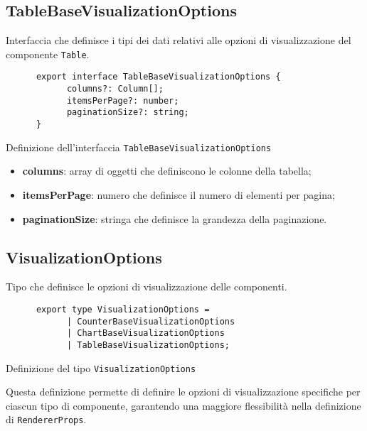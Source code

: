 \subsection{TableBaseVisualizationOptions}
Interfaccia che definisce i tipi dei dati relativi alle opzioni di visualizzazione del componente \texttt{Table}.
\begin{listing}[H]
      \begin{verbatim}
      export interface TableBaseVisualizationOptions {
            columns?: Column[];
            itemsPerPage?: number;
            paginationSize?: string;
      }
      \end{verbatim}
      \caption{Definizione dell'interfaccia \texttt{TableBaseVisualizationOptions}}
      \label{listing:tableBaseVisualizationOptions}
\end{listing}
\begin{itemize}
      \item \textbf{columns}: array di oggetti che definiscono le colonne della tabella;
      \item \textbf{itemsPerPage}: numero che definisce il numero di elementi per pagina;
      \item \textbf{paginationSize}: stringa che definisce la grandezza della paginazione.
\end{itemize}

\subsection{VisualizationOptions}
Tipo che definisce le opzioni di visualizzazione delle componenti.
\begin{listing}[H]
      \begin{verbatim}
      export type VisualizationOptions = 
            | CounterBaseVisualizationOptions 
            | ChartBaseVisualizationOptions 
            | TableBaseVisualizationOptions;
      \end{verbatim}
      \caption{Definizione del tipo \texttt{VisualizationOptions}}
      \label{listing:visualizationOptions}
\end{listing}
Questa definizione permette di definire le opzioni di visualizzazione specifiche per ciascun tipo di componente, garantendo una maggiore flessibilità
nella definizione di \texttt{RendererProps}.

